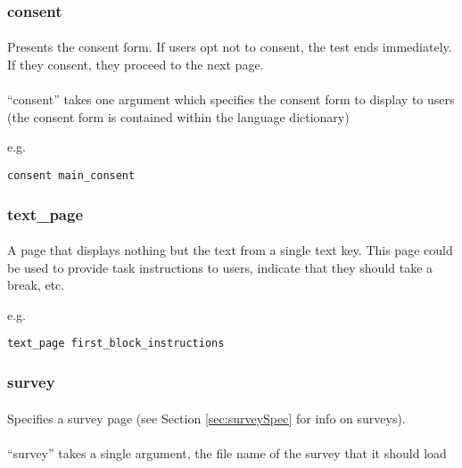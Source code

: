 \subsubsection{consent}

\paragraph{}
Presents the consent form.  If users opt not to consent, the test ends immediately.  If they consent, they proceed to the next page.

\paragraph{}
``consent'' takes one argument which specifies the consent form to display to users (the consent form is contained within the language dictionary)

e.g.

\begin{lstlisting}
consent main_consent
\end{lstlisting}

\subsubsection{text\_page}

\paragraph{}
A page that displays nothing but the text from a single text key.  This page could be used to provide task instructions to users, indicate that they should take a break, etc.

e.g.

\begin{lstlisting}
text_page first_block_instructions
\end{lstlisting}

\subsubsection{survey}

\paragraph{}
Specifies a survey page (see Section \ref{sec:surveySpec} for info on surveys).

\paragraph{}
``survey'' takes a single argument, the file name of the survey that it should load

